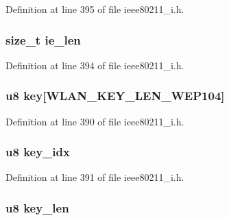 Definition at line 395 of file ieee80211\-\_\-i.\-h.

\hypertarget{structieee80211__mgd__auth__data_a0b939c31983d2de4c3429bb789779638}{
\subsubsection[{ie\-\_\-len}]{\setlength{\rightskip}{0pt plus 5cm}size\-\_\-t ie\-\_\-len}}\label{structieee80211__mgd__auth__data_a0b939c31983d2de4c3429bb789779638}


Definition at line 394 of file ieee80211\-\_\-i.\-h.

\hypertarget{structieee80211__mgd__auth__data_a54c7b6b270bee3f1d18fad51c228779c}{
\subsubsection[{key}]{\setlength{\rightskip}{0pt plus 5cm}u8 key\mbox{[}W\-L\-A\-N\-\_\-\-K\-E\-Y\-\_\-\-L\-E\-N\-\_\-\-W\-E\-P104\mbox{]}}}\label{structieee80211__mgd__auth__data_a54c7b6b270bee3f1d18fad51c228779c}


Definition at line 390 of file ieee80211\-\_\-i.\-h.

\hypertarget{structieee80211__mgd__auth__data_aa2edccbb034732153bf9cbf5412660f9}{
\subsubsection[{key\-\_\-idx}]{\setlength{\rightskip}{0pt plus 5cm}u8 key\-\_\-idx}}\label{structieee80211__mgd__auth__data_aa2edccbb034732153bf9cbf5412660f9}


Definition at line 391 of file ieee80211\-\_\-i.\-h.

\hypertarget{structieee80211__mgd__auth__data_aec6022b50f2f89ff144d7b68d09b7ffe}{
\subsubsection[{key\-\_\-len}]{\setlength{\rightskip}{0pt plus 5cm}u8 key\-\_\-len}}\label{structieee80211__mgd__auth__data_aec6022b50f2f89ff144d7b68d09b7ffe}


